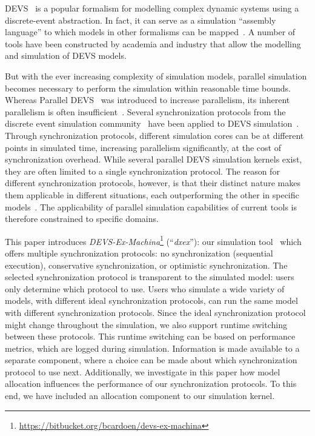 \textsf{DEVS}~\cite{ClassicDEVS} is a popular formalism for modelling complex dynamic systems using a discrete-event abstraction.
In fact, it can serve as a simulation ``assembly language'' to which models in other formalisms can be mapped~\cite{DEVSbase}.
A number of tools have been constructed by academia and industry that allow the modelling and simulation of \textsf{DEVS} models.

But with the ever increasing complexity of simulation models, parallel simulation becomes necessary to perform the simulation within reasonable time bounds.
Whereas \textsf{Parallel DEVS}~\cite{ParallelDEVS} was introduced to increase parallelism, its inherent parallelism is often insufficient~\cite{Himmelspach}.
Several synchronization protocols from the discrete event simulation community~\cite{FujimotoBook} have been applied to \textsf{DEVS} simulation~\cite{globaltimewarp}.
Through synchronization protocols, different simulation cores can be at different points in simulated time, increasing parallelism significantly, at the cost of synchronization overhead.
While several parallel \textsf{DEVS} simulation kernels exist, they are often limited to a single synchronization protocol.
The reason for different synchronization protocols, however, is that their distinct nature makes them applicable in different situations, each outperforming the other in specific models~\cite{Jafer}.
The applicability of parallel simulation capabilities of current tools is therefore constrained to specific domains.

This paper introduces \textit{DEVS-Ex-Machina}\footnote{\url{https://bitbucket.org/bcardoen/devs-ex-machina}} (``\textit{dxex}''): our simulation tool~\cite{dxex} which offers multiple synchronization protocols: no synchronization (sequential execution), conservative synchronization, or optimistic synchronization.
The selected synchronization protocol is transparent to the simulated model: users only determine which protocol to use.
Users who simulate a wide variety of models, with different ideal synchronization protocols, can run the same model with different synchronization protocols.
Since the ideal synchronization protocol might change throughout the simulation, we also support runtime switching between these protocols.
This runtime switching can be based on performance metrics, which are logged during simulation.
Information is made available to a separate component, where a choice can be made about which synchronization protocol to use next. %
Additionally, we investigate in this paper how model allocation influences the performance of our synchronization protocols.
To this end, we have included an allocation component to our simulation kernel.

